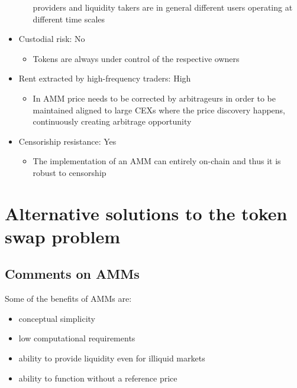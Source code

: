 \documentclass[11pt, reqno]{amsart}
\theoremstyle{definition}
\theoremstyle{remark}
\begin{document}
\begin{itemize}
\begin{itemize}
                providers and liquidity takers are in general different users
                operating at different time scales
	      \end{itemize}
	\item Custodial risk: No
	      \begin{itemize}
		      \item Tokens are always under control of the respective owners
	      \end{itemize}
	\item Rent extracted by high-frequency traders: High
	      \begin{itemize}
              \item In AMM price needs to be corrected by arbitrageurs in order
                to be maintained aligned to large CEXs where the price
                discovery happens, continuously creating arbitrage opportunity
	      \end{itemize}
	\item Censoriship resistance: Yes
	      \begin{itemize}
              \item The implementation of an AMM can entirely on-chain and thus
                it is robust to censorship
	      \end{itemize}
\end{itemize}


\section{Alternative solutions to the token swap problem}

\subsection{Comments on AMMs}

Some of the benefits of AMMs are:
\begin{itemize}
	\item conceptual simplicity
	\item low computational requirements
	\item ability to provide liquidity even for illiquid markets
	\item ability to function without a reference price
\end{itemize}
\end{document}
